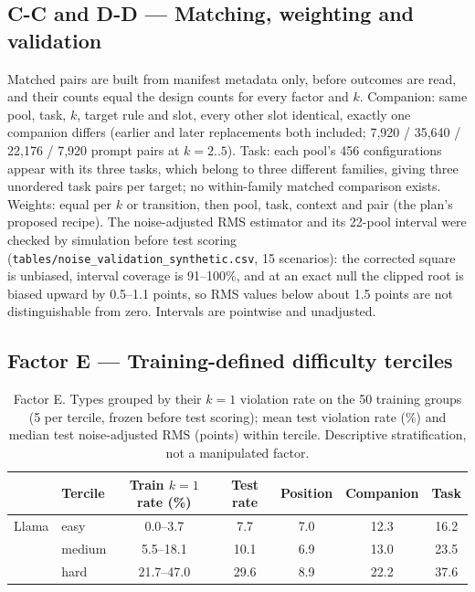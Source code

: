 \subsection*{C-C and D-D --- Matching, weighting and validation}
Matched pairs are built from manifest metadata only, before outcomes are read, and their counts equal the design counts for every factor and $k$. Companion: same pool, task, $k$, target rule and slot, every other slot identical, exactly one companion differs (earlier and later replacements both included; 7,920 / 35,640 / 22,176 / 7,920 prompt pairs at $k=2..5$). Task: each pool's 456 configurations appear with its three tasks, which belong to three different families, giving three unordered task pairs per target; no within-family matched comparison exists. Weights: equal per $k$ or transition, then pool, task, context and pair (the plan's proposed recipe). The noise-adjusted RMS estimator and its 22-pool interval were checked by simulation before test scoring (\texttt{tables/noise\_validation\_synthetic.csv}, 15 scenarios): the corrected square is unbiased, interval coverage is 91--100\%, and at an exact null the clipped root is biased upward by 0.5--1.1 points, so RMS values below about 1.5 points are not distinguishable from zero. Intervals are pointwise and unadjusted.

\subsection*{Factor E --- Training-defined difficulty terciles}
\begin{table}[h]
\centering\scriptsize
\caption{Factor E. Types grouped by their $k=1$ violation rate on the 50 training groups (5 per tercile, frozen before test scoring); mean test violation rate (\%) and median test noise-adjusted RMS (points) within tercile. Descriptive stratification, not a manipulated factor.}
\label{tab:E}
\begin{tabular}{llccccc}
\toprule
 & Tercile & Train $k{=}1$ rate (\%) & Test rate & Position & Companion & Task \\
\midrule
Llama & easy & 0.0--3.7 & 7.7 & 7.0 & 12.3 & 16.2 \\
 & medium & 5.5--18.1 & 10.1 & 6.9 & 13.0 & 23.5 \\
 & hard & 21.7--47.0 & 29.6 & 8.9 & 22.2 & 37.6 \\
\bottomrule
\end{tabular}
\end{table}

